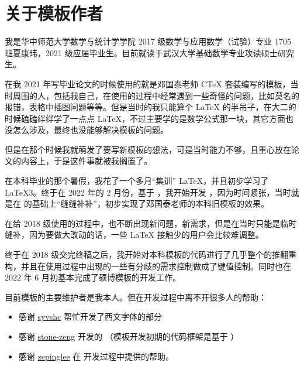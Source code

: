 
\section{关于模板作者}

我是华中师范大学数学与统计学学院 2017 级数学与应用数学（试验）专业 1705 班夏康玮，2021 级应届毕业生。目前就读于武汉大学基础数学专业攻读硕士研究生。

在我 2021 年写毕业论文的时候使用的就是邓国泰老师 CTeX 套装编写的模板，当时周围的人，包括我自己，在使用的过程中经常遇到一些奇怪的问题，比如莫名的报错，表格中插图问题等等。但是当时的我只能算个 \LaTeX{} 的半吊子，在大二的时候磕磕绊绊学了一点点 \LaTeX{}，不过主要学的是数学公式那一块，其它方面也没怎么涉及，最终也没能够解决模板的问题。

但是在那个时候我就萌发了要写新模板的想法，可是当时能力不够，且重心放在论文的内容上，于是这件事就被我搁置了。

在本科毕业的那个暑假，我花了一个多月“集训” \LaTeX{}，并且初步学习了 \LaTeX3。终于在 2022 年的 2 月份，基于 ，我开始开发 ，因为时间紧张，当时就是在  的基础上“缝缝补补”，初步实现了邓国泰老师的本科旧模板的效果。

在给 2018 级使用的过程中，也不断出现新问题，新需求，但是在当时只能是临时缝补，因为要做大改动的话，一些 \LaTeX{} 接触少的用户会比较难调整。

终于在 2018 级交完终稿之后，我开始对本科模板的代码进行了几乎整个的推翻重构，并且在使用过程中出现的一些有分歧的需求控制做成了键值控制。同时也在 2022 年 6 月初基本完成了硕博模板的开发工作。

目前模板的主要维护者是我本人。但在开发过程中离不开很多人的帮助：
\begin{itemize}
  \item 感谢 \href{https://github.com/syvshc}{syvshc} 帮忙开发了西文字体的部分
  \item 感谢 \href{https://github.com/stone-zeng}{stone-zeng} 开发的  （模板开发初期的代码框架是基于 ）
  \item 感谢 \href{https://github.com/zepinglee}{zepinglee} 在  开发过程中提供的帮助。
\end{itemize}
